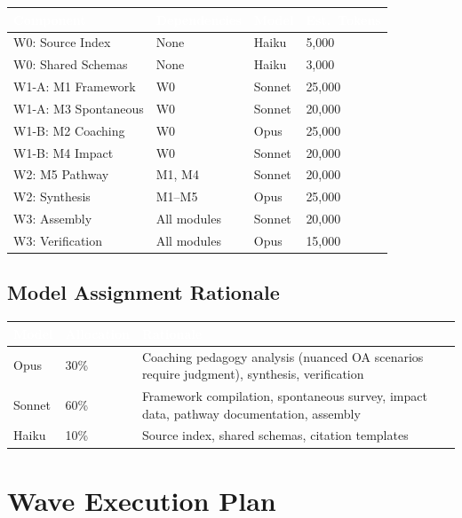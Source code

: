 \documentclass[11pt,letterpaper]{article}
\newcommand{\tableheader}[1]{\textbf{\sffamily\textcolor{white}{#1}}}
\begin{document}
\begin{center}
\begin{tabularx}{\textwidth}{L{3.5cm}L{2.5cm}C{1.5cm}C{2cm}}
\toprule
{}
\tableheader{Component} & \tableheader{Dependencies} & \tableheader{Model} & \tableheader{Est.\ Tokens} \\
\midrule
W0: Source Index & None & Haiku & 5,000 \\
W0: Shared Schemas & None & Haiku & 3,000 \\
W1-A: M1 Framework & W0 & Sonnet & 25,000 \\
W1-A: M3 Spontaneous & W0 & Sonnet & 20,000 \\
W1-B: M2 Coaching & W0 & Opus & 25,000 \\
W1-B: M4 Impact & W0 & Sonnet & 20,000 \\
W2: M5 Pathway & M1, M4 & Sonnet & 20,000 \\
W2: Synthesis & M1--M5 & Opus & 25,000 \\
W3: Assembly & All modules & Sonnet & 20,000 \\
W3: Verification & All modules & Opus & 15,000 \\
\bottomrule
\end{tabularx}
\end{center}

\subsection{Model Assignment Rationale}

\begin{center}
\begin{tabularx}{\textwidth}{C{1.5cm}C{1.5cm}X}
\toprule
{}
\tableheader{Model} & \tableheader{Allocation} & \tableheader{Rationale} \\
\midrule
Opus & 30\% & Coaching pedagogy analysis (nuanced OA scenarios require judgment), synthesis, verification \\
Sonnet & 60\% & Framework compilation, spontaneous survey, impact data, pathway documentation, assembly \\
Haiku & 10\% & Source index, shared schemas, citation templates \\
\bottomrule
\end{tabularx}
\end{center}

\section{Wave Execution Plan}
\end{document}
